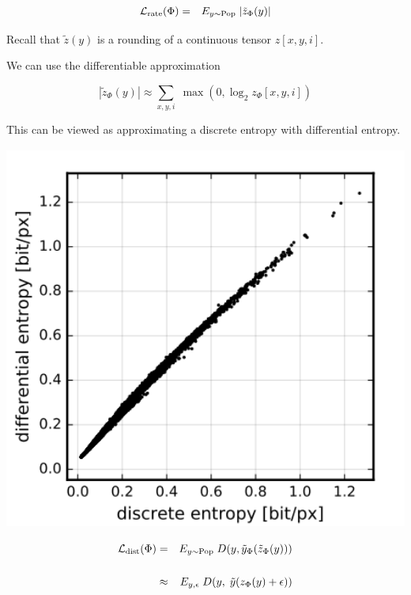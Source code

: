 {

\begin{eqnarray*}
{\cal L}_{\mathrm{rate}}(\Phi) & = & E_{y \sim \mathrm{Pop}}\;|\tilde{z}_\Phi(y)| 
\end{eqnarray*}

\vfill
Recall that $\tilde{z}(y)$ is a rounding of a continuous tensor $z[x,y,i]$.

\vfill
We can use the differentiable approximation

\vfill
$$|\tilde{z}_\Phi(y)| \approx \sum_{x,y,i} \; \max(0,\log_2 z_\Phi[x,y,i])$$

\vfill
This can be viewed as approximating a discrete entropy with differential entropy.


\bigskip
\centerline{\includegraphics[height=5in]{../images/RateDist6}}


\begin{eqnarray*}
{\cal L}_{\mathrm{dist}}(\Phi) & = & E_{y \sim \mathrm{Pop}} \;D(y,\tilde{y}_\Phi(\tilde{z}_\Phi(y))) \\
\\
& \approx & E_{y,\epsilon} \;D(y,\;\tilde{y}(z_\Phi(y) + \epsilon))
\end{eqnarray*}

}
